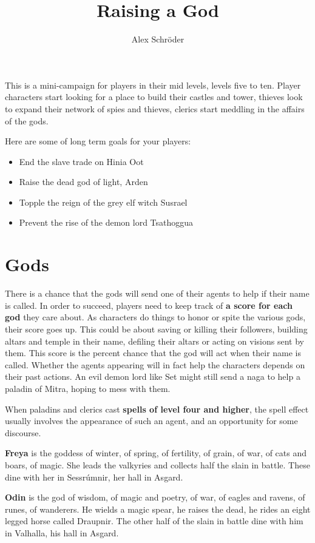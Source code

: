 \documentclass[11pt]{bxart}
\title{\textbf{Raising a God}}
\author{Alex Schröder}
\begin{document}
\maketitle
\tableofcontents

This is a mini-campaign for players in their mid levels, levels five to ten. Player characters start looking for a place to build their castles and tower, thieves look to expand their network of spies and thieves, clerics start meddling in the affairs of the gods.

Here are some of long term goals for your players:

\begin{itemize}
\item End the slave trade on Hinia Oot
\item Raise the dead god of light, Arden
\item Topple the reign of the grey elf witch Susrael
\item Prevent the rise of the demon lord Tsathoggua
\end{itemize}

\section{Gods}

There is a chance that the gods will send one of their agents to help if their name is called. In order to succeed, players need to keep track of \textbf{a score for each god} they care about. As characters do things to honor or spite the various gods, their score goes up. This could be about saving or killing their followers, building altars and temple in their name, defiling their altars or acting on visions sent by them. This score is the percent chance that the god will act when their name is called. Whether the agents appearing will in fact help the characters depends on their past actions. An evil demon lord like Set might still send a naga to help a paladin of Mitra, hoping to mess with them.

When paladins and clerics cast \textbf{spells of level four and higher}, the spell effect usually involves the appearance of such an agent, and an opportunity for some discourse.

\textbf{Freya} is the goddess of winter, of spring, of fertility, of grain, of war, of cats and boars, of magic. She leads the valkyries and collects half the slain in battle. These dine with her in Sessrúmnir, her hall in Asgard.

\textbf{Odin} is the god of wisdom, of magic and poetry, of war, of eagles and ravens, of runes, of wanderers. He wields a magic spear, he raises the dead, he rides an eight legged horse called Draupnir. The other half of the slain in battle dine with him in Valhalla, his hall in Asgard.
\end{document}
